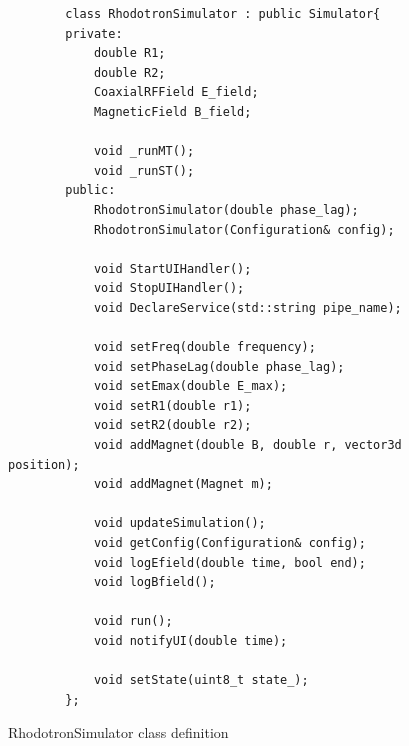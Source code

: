 \documentclass[a4paper,oneside,12pt]{report}
\numberwithin{equation}{chapter}
\begin{document}
\begin{figure}[H]
    \centering
    \captionsetup{justification=centering}
    \begin{verbatim}
        class RhodotronSimulator : public Simulator{
        private:
            double R1;
            double R2;
            CoaxialRFField E_field;
            MagneticField B_field;

            void _runMT();
            void _runST();
        public:
            RhodotronSimulator(double phase_lag);
            RhodotronSimulator(Configuration& config);

            void StartUIHandler();
            void StopUIHandler();
            void DeclareService(std::string pipe_name);

            void setFreq(double frequency);
            void setPhaseLag(double phase_lag);
            void setEmax(double E_max);
            void setR1(double r1);
            void setR2(double r2);
            void addMagnet(double B, double r, vector3d position);
            void addMagnet(Magnet m);
            
            void updateSimulation();
            void getConfig(Configuration& config);
            void logEfield(double time, bool end);
            void logBfield();

            void run();
            void notifyUI(double time);

            void setState(uint8_t state_);
        };
    \end{verbatim}
    \caption{RhodotronSimulator class definition}
    \label{fig:rhodosim_class}
\end{figure}
\end{document}
